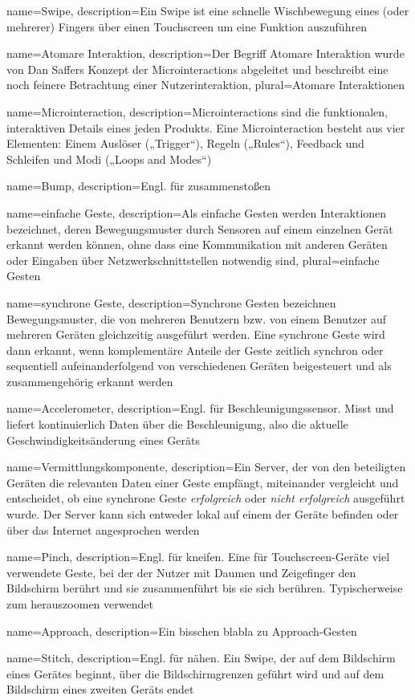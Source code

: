 {
    name=Swipe,
    description={Ein Swipe ist eine schnelle Wischbewegung eines (oder mehrerer) Fingers über einen Touchscreen um eine Funktion auszuführen}
}

{
    name=Atomare Interaktion,
    description={Der Begriff Atomare Interaktion wurde von Dan Saffers Konzept der Microinteractions abgeleitet und beschreibt eine noch feinere Betrachtung einer Nutzerinteraktion},
    plural={Atomare Interaktionen}
}

{
    name=Microinteraction,
    description={Microinteractions sind die funktionalen, interaktiven Details eines jeden Produkts. Eine Microinteraction besteht aus vier Elementen: Einem Auslöser („Trigger“), Regeln („Rules“), Feedback und Schleifen und Modi („Loops and Modes“)}
}

{
	name=Bump,
	description={Engl. für zusammenstoßen}
}

{
	name=einfache Geste,
	description={Als einfache Gesten werden Interaktionen bezeichnet, deren Bewegungsmuster durch Sensoren auf einem einzelnen Gerät erkannt werden können, ohne dass eine Kommunikation mit anderen Geräten oder Eingaben über Netzwerkschnittstellen notwendig sind},
	plural={einfache Gesten}
}

{
	name=synchrone Geste,
	description={Synchrone Gesten bezeichnen Bewegungsmuster, die von mehreren Benutzern bzw. von einem Benutzer auf mehreren Geräten gleichzeitig ausgeführt werden. Eine synchrone Geste wird dann erkannt, wenn komplementäre Anteile der Geste zeitlich synchron oder sequentiell aufeinanderfolgend von verschiedenen Geräten beigesteuert und als zusammengehörig erkannt werden \citep{Hinckley2003}}
}

{
	name=Accelerometer,
	description={Engl. für Beschleunigungssensor. Misst und liefert kontinuierlich Daten über die Beschleunigung, also die aktuelle Geschwindigkeitsänderung eines Geräts}
}

{
	name=Vermittlungskomponente,
	description={Ein Server, der von den beteiligten Geräten die relevanten Daten einer Geste empfängt, miteinander vergleicht und entscheidet, ob eine synchrone Geste \textit{erfolgreich} oder \textit{nicht erfolgreich} ausgeführt wurde. Der Server kann sich entweder lokal auf einem der Geräte befinden oder über das Internet angesprochen werden}
}

{
	name=Pinch,
	description={Engl. für kneifen. Eine für Touchscreen-Geräte viel verwendete Geste, bei der der Nutzer mit Daumen und Zeigefinger den Bildschirm berührt und sie zusammenführt bis sie sich berühren. Typischerweise zum herauszoomen verwendet}
}

{
	name=Approach,
	description={Ein bisschen blabla zu Approach-Gesten}
}

{
	name=Stitch,
	description={Engl. für nähen. Ein Swipe, der auf dem Bildschirm eines Gerätes beginnt, über die Bildschirmgrenzen geführt wird und auf dem Bildschirm eines zweiten Geräts endet}
}